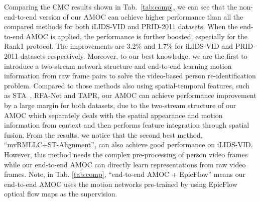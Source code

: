 \documentclass[journal]{IEEEtran}
\begin{document}
 Comparing the CMC results shown in Tab.~\ref{tab:comp}, we can see that the non-end-to-end version of our AMOC can achieve higher performance than all the compared methods for both iLIDS-VID and PRID-2011 datasets. When the end-to-end AMOC is applied, the performance is further boosted, especially for the Rank1 protocol. The improvements are 3.2\% and 1.7\% for iLIDS-VID and PRID-2011 datasets respectively. Moreover, to our best knowledge, we are the first to introduce a two-stream network structure and end-to-end learning motion information from raw frame pairs  to solve the video-based person re-identification problem. Compared to those methods also using spatial-temporal features, such as STA~\cite{liu2015spatio}, RFA-Net\cite{yan2016person}  and TAPR\cite{gao2016temporally},  our AMOC can achieve performance improvement by a large margin for both datasets, due to the two-stream structure of our AMOC which separately deals with the spatial appearance and motion information from context and then performs feature integration through spatial fusion. From the results, we notice that the second best method, ``mvRMLLC+ST-Alignment\cite{chen2015person}'', can also achieve good performance on iLIDS-VID. However, this method needs the complex pre-processing of person video frames while our end-to-end AMOC can directly learn representations from raw video frames. Note, in Tab. \ref{tab:comp}, ``end-to-end AMOC + EpicFlow'' means our end-to-end AMOC uses the motion networks pre-trained by using EpicFlow optical flow maps as the supervision.  
 
 
%
%
\end{document}
